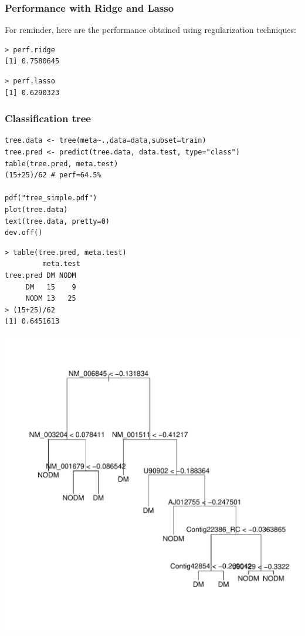 \documentclass[11pt, a4paper]{article}
\begin{document}
\subsubsection{Performance with Ridge and Lasso}
\label{sec-1-2-1}

For reminder, here are the performance obtained using regularization
techniques:


\begin{verbatim}
> perf.ridge
[1] 0.7580645
\end{verbatim}


\begin{verbatim}
> perf.lasso
[1] 0.6290323
\end{verbatim}
\subsubsection{Classification tree}
\label{sec-1-2-2}


\begin{verbatim}
tree.data <- tree(meta~.,data=data,subset=train)
tree.pred <- predict(tree.data, data.test, type="class")
table(tree.pred, meta.test)
(15+25)/62 # perf=64.5%

pdf("tree_simple.pdf")
plot(tree.data)
text(tree.data, pretty=0)
dev.off()
\end{verbatim}


\begin{verbatim}
> table(tree.pred, meta.test)
         meta.test
tree.pred DM NODM
     DM   15    9
     NODM 13   25
> (15+25)/62
[1] 0.6451613
\end{verbatim}

\includegraphics[scale=0.7]{tree_simple.pdf}
\end{document}

